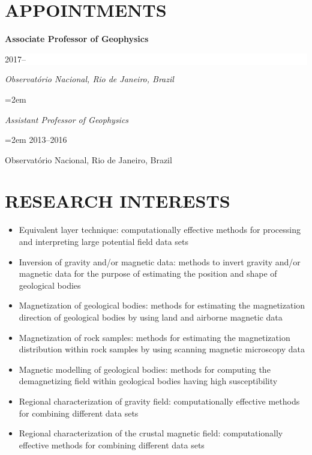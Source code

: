 \documentclass[paper=letter,fontsize=11pt]{scrartcl} %
\newcommand{\NewPart}[2]{\section*{\uppercase{#1} #2}}
\newcommand{\EducationEntry}[4]{
		\noindent \textbf{#1} \hfill      %
		\colorbox{White}{%
			\parbox{10em}{%
			\hfill\color{Black}#2}} \par  %
		\noindent \textit{#3} \par        %
		\noindent\hangindent=2em\hangafter=0 \small #4 %
		\normalsize \par}
\begin{document}
\NewPart{Appointments}{}



\EducationEntry{Associate Professor of Geophysics}{2017--}
{Observat\'{o}rio Nacional, Rio de Janeiro, Brazil}

\EducationEntry{Assistant Professor of Geophysics}{2013--2016}
{Observat\'{o}rio Nacional, Rio de Janeiro, Brazil}

\NewPart{Research interests}{}

{\begin{itemize}

\item{Equivalent layer technique: computationally effective methods for processing and interpreting large potential field data sets}

\item{Inversion of gravity and/or magnetic data: methods to invert gravity and/or magnetic data for the purpose of estimating the position and shape of geological bodies}

\item{Magnetization of geological bodies: methods for estimating the magnetization direction of geological bodies by using land and airborne magnetic data}

\item{Magnetization of rock samples: methods for estimating the magnetization distribution within rock samples by using scanning magnetic microscopy data}

\item{Magnetic modelling of geological bodies: methods for computing the demagnetizing field within geological bodies having high susceptibility}

\item{Regional characterization of gravity field: computationally effective methods for combining different data sets}

\item{Regional characterization of the crustal magnetic field: computationally effective methods for combining different data sets}

\end{itemize}}
\end{document}
